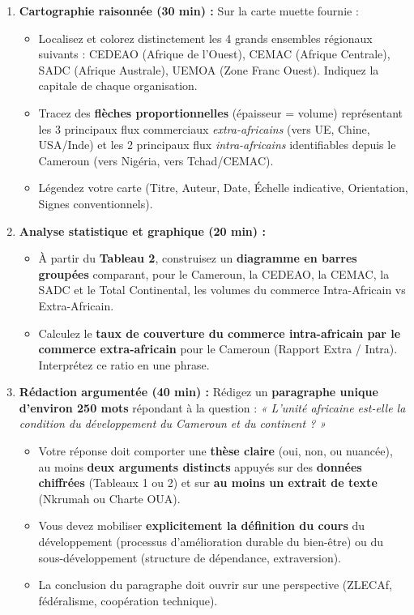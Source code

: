 \documentclass[11pt]{article}
\newcommand{\cle}[1]{{\popxbold\color{popdark}#1}}
\begin{document}
\begin{enumerate}
    \item \textbf{Cartographie raisonnée (30 min) :} Sur la carte muette fournie :
    \begin{itemize}
        \item Localisez et colorez distinctement les 4 grands ensembles régionaux suivants : \cle{CEDEAO} (Afrique de l'Ouest), \cle{CEMAC} (Afrique Centrale), \cle{SADC} (Afrique Australe), \cle{UEMOA} (Zone Franc Ouest). Indiquez la capitale de chaque organisation.
        \item Tracez des \textbf{flèches proportionnelles} (épaisseur = volume) représentant les 3 principaux flux commerciaux \emph{extra-africains} (vers UE, Chine, USA/Inde) et les 2 principaux flux \emph{intra-africains} identifiables depuis le Cameroun (vers Nigéria, vers Tchad/CEMAC).
        \item Légendez votre carte (Titre, Auteur, Date, Échelle indicative, Orientation, Signes conventionnels).
    \end{itemize}
    
    \item \textbf{Analyse statistique et graphique (20 min) :}
    \begin{itemize}
        \item À partir du \textbf{Tableau 2}, construisez un \textbf{diagramme en barres groupées} comparant, pour le Cameroun, la CEDEAO, la CEMAC, la SADC et le Total Continental, les volumes du commerce Intra-Africain vs Extra-Africain.
        \item Calculez le \textbf{taux de couverture du commerce intra-africain par le commerce extra-africain} pour le Cameroun (Rapport Extra / Intra). Interprétez ce ratio en une phrase.
    \end{itemize}
    
    \item \textbf{Rédaction argumentée (40 min) :} Rédigez un \textbf{paragraphe unique d'environ 250 mots} répondant à la question : \emph{« L'unité africaine est-elle la condition du développement du Cameroun et du continent ? »}
    \begin{itemize}
        \item Votre réponse doit comporter une \textbf{thèse claire} (oui, non, ou nuancée), au moins \textbf{deux arguments distincts} appuyés sur des \textbf{données chiffrées} (Tableaux 1 ou 2) et sur \textbf{au moins un extrait de texte} (Nkrumah ou Charte OUA).
        \item Vous devez mobiliser \textbf{explicitement la définition du cours} du \cle{développement} (processus d'amélioration durable du bien-être) ou du \cle{sous-développement} (structure de dépendance, extraversion).
        \item La conclusion du paragraphe doit ouvrir sur une perspective (ZLECAf, fédéralisme, coopération technique).
    \end{itemize}
\end{enumerate}
\end{document}
